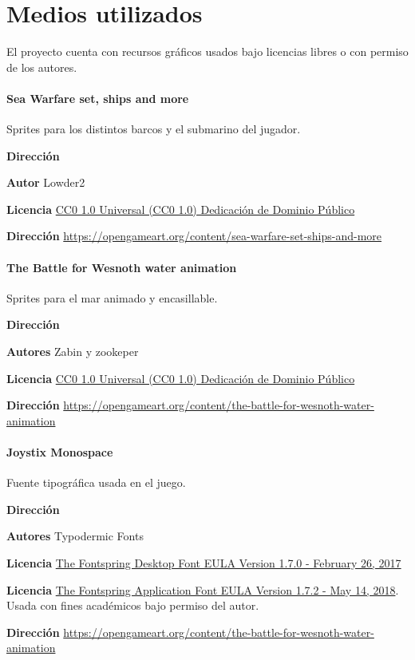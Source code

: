 \documentclass[a4paper,
	11pt,
	parskip=full,
	bibliography=totoc,
	twoside
	]{scrartcl}
\let\oldsection\section
\def\section{\cleardoubleoddpage\oldsection}
\begin{document}
\section{Medios utilizados}
\label{sec:medios}
	El proyecto cuenta con recursos gráficos usados bajo licencias libres o con permiso de los autores.
	
	\paragraph{Sea Warfare set, ships and more}
		Sprites para los distintos barcos y el submarino del jugador.
		\begin{labeling}{\textbf{Dirección}}
			\item[\textbf{Autor}] Lowder2
			\item[\textbf{Licencia}] \href{https://creativecommons.org/publicdomain/zero/1.0/deed.es}{CC0 1.0 Universal (CC0 1.0)
				Dedicación de Dominio Público}
			\item[\textbf{Dirección}] \href{https://opengameart.org/content/sea-warfare-set-ships-and-more}{https://opengameart.org/content/sea-warfare-set-ships-and-more}
		\end{labeling}
	
	\paragraph{The Battle for Wesnoth water animation}
	Sprites para el mar animado y encasillable.
	\begin{labeling}{\textbf{Dirección}}
		\item[\textbf{Autores}] Zabin y zookeper
		\item[\textbf{Licencia}] \href{https://creativecommons.org/publicdomain/zero/1.0/deed.es}{CC0 1.0 Universal (CC0 1.0)
			Dedicación de Dominio Público}
		\item[\textbf{Dirección}] \href{https://opengameart.org/content/the-battle-for-wesnoth-water-animation}{https://opengameart.org/content/the-battle-for-wesnoth-water-animation}
	\end{labeling}

	\paragraph{Joystix Monospace}
	Fuente tipográfica usada en el juego.
	\begin{labeling}{\textbf{Dirección}}
		\item[\textbf{Autores}] Typodermic Fonts
		\item[\textbf{Licencia}] \href{https://www.fontspring.com/lic/jcefupvyrh}{The Fontspring Desktop Font EULA Version 1.7.0 - February 26, 2017} 
		\item[\textbf{Licencia}] \href{https://www.fontspring.com/lic/avhl0opgxj}{The Fontspring Application Font EULA Version 1.7.2 - May 14, 2018}. Usada con fines académicos bajo permiso del autor.
		\item[\textbf{Dirección}] \href{https://opengameart.org/content/the-battle-for-wesnoth-water-animation}{https://opengameart.org/content/the-battle-for-wesnoth-water-animation}
	\end{labeling}
\end{document}
